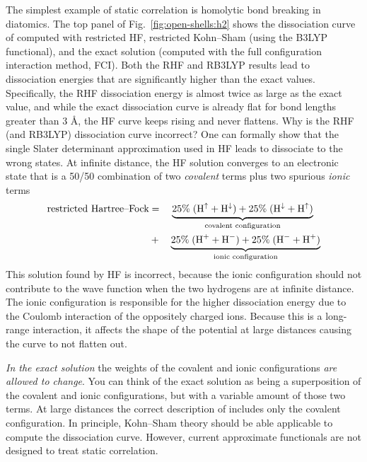 \documentclass[../Main/chem371-notes.tex]{subfiles}
\begin{document}
The simplest example of static correlation is homolytic bond breaking in  diatomics.
The top panel of Fig.~\ref{fig:open-shells:h2} shows the dissociation curve of  computed with restricted HF, restricted Kohn--Sham (using the B3LYP functional), and the exact solution (computed with the full configuration interaction method, FCI).
Both the RHF and RB3LYP results lead to dissociation energies that are significantly higher than the exact values.
Specifically, the RHF dissociation energy is almost twice as large as the exact value, and while the exact dissociation curve is already flat for bond lengths greater than 3 \AA{}, the HF curve keeps rising and never flattens.
Why is the RHF (and RB3LYP) dissociation curve incorrect?
One can formally show that the single Slater determinant approximation used in HF leads  to dissociate to the wrong states.
At infinite distance, the HF solution converges to an electronic state that is a 50/50 combination of two \emph{covalent} terms plus two spurious \emph{ionic} terms
\begin{equation}
\begin{split}
\text{restricted Hartree--Fock} & = \quad \underbrace{25\% \; (\ce{H}^{\uparrow} + \ce{H}^{\downarrow}) + 25\% \; (\ce{H}^{\downarrow} + \ce{H}^{\uparrow})}_{\text{covalent configuration}} \\
& + \quad 
\underbrace{25\% \; (\ce{H+} + \ce{H-}) + 25\% \; (\ce{H-} + \ce{H+})}_{\text{ionic configuration}}
\end{split}
\end{equation}
This solution found by HF is incorrect, because the ionic configuration should not contribute to the wave function when the two hydrogens are at infinite distance.
The ionic configuration is responsible for the higher dissociation energy due to the Coulomb interaction of the oppositely charged ions.
Because this is a long-range interaction, it affects the shape of the potential at large distances causing the curve to not flatten out.

\emph{In the exact solution} the weights of the covalent and ionic configurations \emph{are allowed to change}.
You can think of the exact solution as being a superposition of the covalent and ionic configurations, but with a variable amount of those two terms. At  large  distances the correct description of  includes only the covalent configuration.
In principle, Kohn--Sham theory should be able applicable to compute the  dissociation curve. However, current approximate functionals are not designed to treat static correlation.
\end{document}
